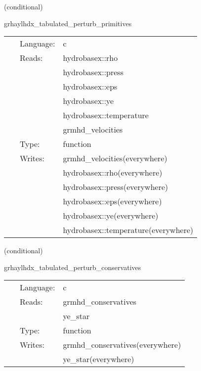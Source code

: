\vspace{5mm}

   (conditional) 

\hspace{5mm} grhaylhdx\_tabulated\_perturb\_primitives 

\hspace{5mm}{\it tabulated version of grhaylhdx\_perturb\_primitives } 


\hspace{5mm}

 \begin{tabular*}{160mm}{cll} 
~ & Language:  & c \\ 
~ & Reads:  & hydrobasex::rho \\ 
~& ~ &hydrobasex::press\\ 
~& ~ &hydrobasex::eps\\ 
~& ~ &hydrobasex::ye\\ 
~& ~ &hydrobasex::temperature\\ 
~& ~ &grmhd\_velocities\\ 
~ & Type:  & function \\ 
~ & Writes:  & grmhd\_velocities(everywhere) \\ 
~& ~ &hydrobasex::rho(everywhere)\\ 
~& ~ &hydrobasex::press(everywhere)\\ 
~& ~ &hydrobasex::eps(everywhere)\\ 
~& ~ &hydrobasex::ye(everywhere)\\ 
~& ~ &hydrobasex::temperature(everywhere)\\ 
\end{tabular*} 


\vspace{5mm}

   (conditional) 

\hspace{5mm} grhaylhdx\_tabulated\_perturb\_conservatives 

\hspace{5mm}{\it tabulated version of grhaylhdx\_perturb\_conservatives } 


\hspace{5mm}

 \begin{tabular*}{160mm}{cll} 
~ & Language:  & c \\ 
~ & Reads:  & grmhd\_conservatives \\ 
~& ~ &ye\_star\\ 
~ & Type:  & function \\ 
~ & Writes:  & grmhd\_conservatives(everywhere) \\ 
~& ~ &ye\_star(everywhere)\\ 
\end{tabular*} 


